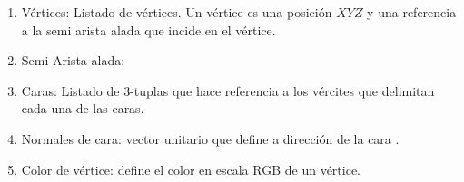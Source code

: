 \begin{enumerate}[label=\textbf{\textit{RI-\arabic*}},ref=RI-\arabic*]
	\item \label{RI1} Vértices: Listado de vértices. Un vértice es una posición $XYZ$ y una referencia a la semi arista alada que incide en el vértice.  
	\item \label{RI2} Semi-Arista alada: 
	\item \label{RI3} Caras: Listado de 3-tuplas que hace referencia a los vércites que delimitan cada una de las caras.
	\item \label{RI4} Normales de cara: vector unitario que define a dirección de la cara \cite{llcFaceVertexNormal}.
	\item \label{RI5} Color de vértice: define el color en escala RGB de un vértice.
	
	
	
\end{enumerate}